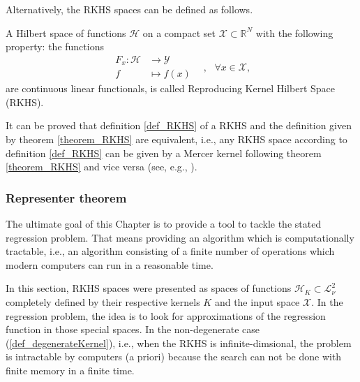 Alternatively, the RKHS spaces can be defined as follows.

\begin{definition}[RKHS] \label{def_RKHS}
  A Hilbert space of functions $\mathcal{H}$ on a compact set $\mathcal{X} \subset \mathbb{R}^N$ with the following property: the functions
  \begin{equation*}
    \begin{aligned}
      F_x : \mathcal{H} &\to \mathcal{Y} \\
            f           &\mapsto f(x) 
    \end{aligned}
    \ \ \ \ , \ \ \ \forall x \in \mathcal{X},
  \end{equation*}
are continuous linear functionals, is called Reproducing Kernel Hilbert Space (RKHS).
\end{definition}

\begin{remark} \label{remark_viceversaRKHStheorem}
  It can be proved that definition \ref{def_RKHS} of a RKHS and the definition given by theorem \ref{theorem_RKHS} are equivalent, i.e., any RKHS space according to definition \ref{def_RKHS} can be given by a Mercer kernel following theorem \ref{theorem_RKHS} and vice versa (see, e.g., \textcite{hofmann2008}).
\end{remark}
      

\subsubsection{Representer theorem} \label{sec_representerTheorem}

The ultimate goal of this Chapter is to provide a tool to tackle the stated regression problem. That means providing an algorithm which is computationally tractable, i.e., an algorithm consisting of a finite number of operations which modern computers can run in a reasonable time. 

In this section, RKHS spaces were presented as spaces of functions $\mathcal{H}_K \subset \mathcal{L}^2_{\nu}$ completely defined by their respective kernels $K$ and the input space $\mathcal{X}$. In the regression problem, the idea is to look for approximations of the regression function in those special spaces. In the non-degenerate case (\ref{def_degenerateKernel}), i.e., when the RKHS is infinite\hyp{}dimsional, the problem is intractable by computers (a priori) because the search can not be done with finite memory in a finite time. 

